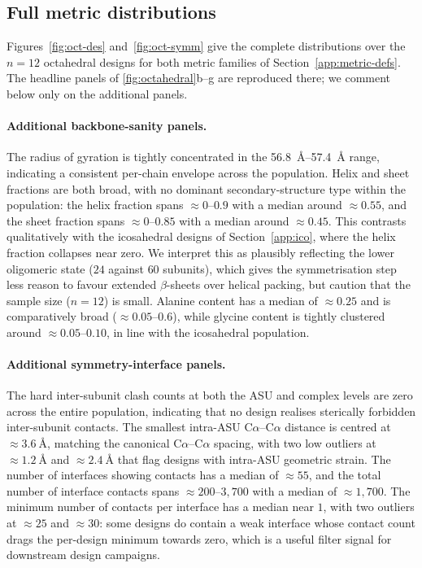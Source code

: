 \subsection*{Full metric distributions}

Figures~\ref{fig:oct-des} and~\ref{fig:oct-symm} give the complete distributions
over the $n{=}12$ octahedral designs for both metric families of
Section~\ref{app:metric-defs}. The headline panels of
\cref{fig:octahedral}b--g are reproduced there; we comment below only on
the additional panels.

\paragraph{Additional backbone-sanity panels.}
The radius of gyration is tightly concentrated in the
\SIrange{56.8}{57.4}{\angstrom} range, indicating a consistent per-chain envelope
across the population. Helix and sheet fractions are both broad, with no
dominant secondary-structure type within the population: the helix fraction
spans $\approx 0$--$0.9$ with a median around $\approx 0.55$, and the sheet
fraction spans $\approx 0$--$0.85$ with a median around $\approx 0.45$. This
contrasts qualitatively with the icosahedral designs of
Section~\ref{app:ico}, where the helix fraction collapses near zero. We interpret
this as plausibly reflecting the lower oligomeric state ($24$ against $60$
subunits), which gives the symmetrisation step less reason to favour extended
$\beta$-sheets over helical packing, but caution that the sample size
($n{=}12$) is small. Alanine content has a median of $\approx 0.25$ and is
comparatively broad ($\approx 0.05$--$0.6$), while glycine content is tightly
clustered around $\approx 0.05$--$0.10$, in line with the icosahedral population.

\paragraph{Additional symmetry-interface panels.}
The hard inter-subunit clash counts at both the ASU and complex levels are zero
across the entire population, indicating that no design realises sterically
forbidden inter-subunit contacts. The smallest intra-ASU C$\alpha$--C$\alpha$
distance is centred at $\approx\SI{3.6}{\angstrom}$, matching the canonical
C$\alpha$--C$\alpha$ spacing, with two low outliers at $\approx\SI{1.2}{\angstrom}$
and $\approx\SI{2.4}{\angstrom}$ that flag designs with intra-ASU geometric
strain. The number of interfaces showing contacts has a median of $\approx 55$,
and the total number of interface contacts spans $\approx 200$--$3{,}700$ with a
median of $\approx 1{,}700$. The minimum number of contacts per interface has a
median near $1$, with two outliers at $\approx 25$ and $\approx 30$: some designs
do contain a weak interface whose contact count drags the per-design minimum
towards zero, which is a useful filter signal for downstream design campaigns.

